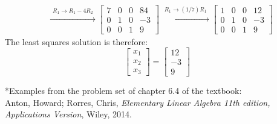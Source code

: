 \documentclass{article}
\begin{document}
\begin{itemize}
\begin{align*}
& \xrightarrow{\begin{array}{c} R_1 \rightarrow R_1 - 4R_2 \end{array}}  
\left[\begin{array}{ccc|c}
7 & 0 & 0 & 84 \\ 
0 & 1 & 0 & -3 \\ 
0 & 0 & 1 &  9  
\end{array}\right] 
\xrightarrow{\begin{array}{c} R_1 \rightarrow (1/7)R_1 \end{array}}  
\left[\begin{array}{ccc|c}
1 & 0 & 0 & 12 \\ 
0 & 1 & 0 & -3 \\ 
0 & 0 & 1 &  9  
\end{array}\right] 
\end{align*}
The least squares solution is therefore:
\[\begin{bmatrix} 
x_1 \\ x_2 \\ x_3
\end{bmatrix} = \begin{bmatrix}
12 \\ -3 \\ 9   
\end{bmatrix}\]
\end{itemize}
*Examples from the problem set of chapter 6.4 of the textbook: \\
Anton, Howard; Rorres, Chris, \emph{Elementary Linear Algebra 11th edition, Applications Version}, Wiley, 2014.
\end{document}
